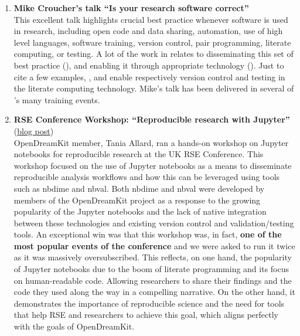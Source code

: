 \begin{enumerate}
\item \textbf{Mike Croucher's talk ``Is your research software correct''}\\
  This excellent talk highlights crucial best practice whenever
  software is used in research, including open code and data sharing,
  automation, use of high level languages, software training, version
  control, pair programming, literate computing, or testing. A lot of
  the work in \ODK relates to disseminating this set of best practice
  (), and enabling it through appropriate technology
  (). Just to cite a few examples,
  , and
   enable respectively version control
  and testing in the \Jupyter literate computing technology.
  Mike's talk has been delivered in several of \ODK's many
  training events.

\item \textbf{RSE Conference Workshop: ``Reproducible research with Jupyter''}
  (\href{https://opendreamkit.org/2018/03/07/opendreamkit-at-the-rse-conference/}{blog post})\\
  OpenDreamKit member, Tania Allard, ran a hands-on workshop on
  Jupyter notebooks for reproducible research at the UK RSE
  Conference. This workshop focused on the use of Jupyter notebooks as
  a means to disseminate reproducible analysis workflows and how this
  can be leveraged using tools such as nbdime and nbval. Both nbdime
  and nbval were developed by members of the OpenDreamKit project as a
  response to the growing popularity of the Jupyter notebooks and the
  lack of native integration between these technologies and existing
  version control and validation/testing tools. An exceptional win was
  that this workshop was, in fact, \textbf{one of the most popular events of
  the conference} and we were asked to run it twice as it was massively
  oversubscribed. This reflects, on one hand, the popularity of
  Jupyter notebooks due to the boom of literate programming and its
  focus on human-readable code. Allowing researchers to share their
  findings and the code they used along the way in a compelling
  narrative. On the other hand, it demonstrates the importance of
  reproducible science and the need for tools that help RSE and
  researchers to achieve this goal, which aligns perfectly with the
  goals of OpenDreamKit.


\end{enumerate}
